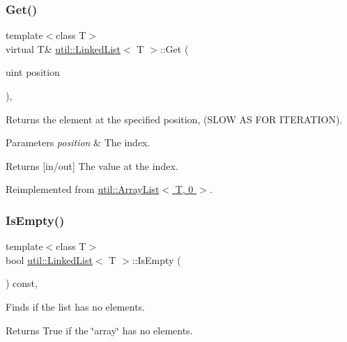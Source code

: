 \subsubsection{\texorpdfstring{Get()}{Get()}}
{\footnotesize\ttfamily template$<$class T$>$ \\
virtual T\& \hyperlink{classutil_1_1LinkedList}{util\+::\+Linked\+List}$<$ T $>$\+::Get (\begin{DoxyParamCaption}\item[{uint}]{position }\end{DoxyParamCaption})\hspace{0.3cm}{\ttfamily [inline]}, {\ttfamily [virtual]}}



Returns the element at the specified position, (S\+L\+OW AS F\+OR I\+T\+E\+R\+A\+T\+I\+ON). 


\begin{DoxyParams}{Parameters}
{\em position} & The index. \\
\hline
\end{DoxyParams}
\begin{DoxyReturn}{Returns}
\mbox{[}in/out\mbox{]} The value at the index. 
\end{DoxyReturn}


Reimplemented from \hyperlink{classutil_1_1ArrayList_ac5a4259af59f7bac9df06851c29d9e37}{util\+::\+Array\+List$<$ T, 0 $>$}.

\mbox{\label{classutil_1_1LinkedList_abd21d7bb75ae121a4f164e1917845470}} 
\subsubsection{\texorpdfstring{Is\+Empty()}{IsEmpty()}}
{\footnotesize\ttfamily template$<$class T$>$ \\
bool \hyperlink{classutil_1_1LinkedList}{util\+::\+Linked\+List}$<$ T $>$\+::Is\+Empty (\begin{DoxyParamCaption}{ }\end{DoxyParamCaption}) const\hspace{0.3cm}{\ttfamily [inline]}, {\ttfamily [virtual]}}



Finds if the list has no elements. 

\begin{DoxyReturn}{Returns}
True if the \char`\"{}array\char`\"{} has no elements. 
\end{DoxyReturn}


